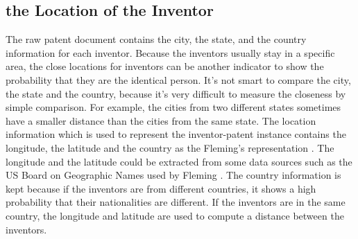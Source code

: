 \subsection{the Location of the Inventor}
The raw patent document contains the city, the state, and the country information for each inventor. Because the inventors usually stay in a specific area, the close locations for inventors can be another indicator to show the probability that they are the identical person. It's not smart to compare the city, the state and the country, because it's very difficult to measure the closeness by simple comparison. For example, the cities from two different states sometimes have a smaller distance than the cities from the same state. The location information which is used to represent the inventor-patent instance contains the longitude, the latitude and the country as the Fleming's representation \cite{RePEc:eee:respol:v:43:y:2014:i:6:p:941-955}. The longitude and the latitude could be extracted from some data sources such as the US Board on Geographic Names used by Fleming \cite{RePEc:eee:respol:v:43:y:2014:i:6:p:941-955}. The country information is kept because if the inventors are from different countries, it shows a high probability that their nationalities are different. If the inventors are in the same country, the longitude and latitude are used to compute a distance between the inventors.



